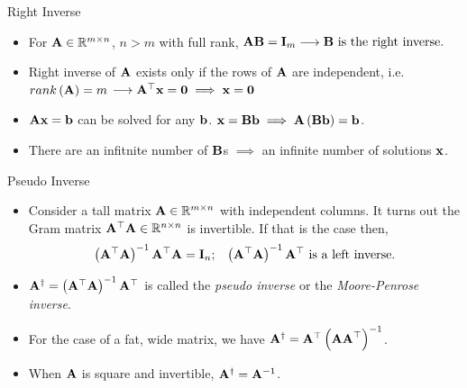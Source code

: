 \documentclass[aspectratio=169]{beamer}
\let\olditem\item
\renewcommand{\item}{\setlength{\itemsep}{\fill}\olditem}
\def\mf{\ensuremath\mathbf}
\def\mb{\ensuremath\mathbb}
\begin{document}
\begin{frame}[t]{Right Inverse}
\begin{itemize}
    \item For $\mf{A} \in \mb{R}^{m \times n}$, $n > m$ with full rank, $\mf{AB} = \mf{I}_m \longrightarrow \mf{B} \text{ is the right inverse.}$

    \item Right inverse of $\mf{A}$ exists only if the rows of $\mf{A}$ are independent, i.e. $rank\left(\mf{A}\right) = m$ $\longrightarrow \mf{A}^\top\mf{x} = \mf{0} \implies \mf{x} = \mf{0}$

    \item $\mf{Ax} = \mf{b}$ can be solved for any $\mf{b}$. $\mf{x} = \mf{Bb} \implies \mf{A}\left(\mf{Bb}\right) = \mf{b}$. 

    \item There are an infitnite number of $\mf{B}$s $\implies$ an infinite number of solutions $\mf{x}$.
\end{itemize}
\end{frame}


\begin{frame}[t]{Pseudo Inverse}
\begin{itemize}
    \item Consider a tall matrix $\mf{A} \in \mb{R}^{m \times n}$ with independent columns. It turns out the Gram matrix $\mf{A}^\top\mf{A} \in \mb{R}^{n \times n}$ is invertible. If that is the case then,
    \[ \left(\mf{A}^\top\mf{A}\right)^{-1}\mf{A}^\top\mf{A} = \mf{I}_n; \,\,\,\,\, \left(\mf{A}^\top\mf{A}\right)^{-1}\mf{A}^\top \text{ is a left inverse.} \]
    \item $\mf{A}^{\dagger} = \left(\mf{A}^\top\mf{A}\right)^{-1}\mf{A}^\top$ is called the \textit{pseudo inverse} or the \textit{Moore-Penrose inverse}.

    \item For the case of a fat, wide matrix, we have $\mf{A}^{\dagger} = \mf{A}^\top\left(\mf{AA}^\top\right)^{-1}$.

    \item When $\mf{A}$ is square and invertible, $\mf{A}^{\dagger} = \mf{A}^{-1}$.
\end{itemize}
\end{frame}


\end{document}
